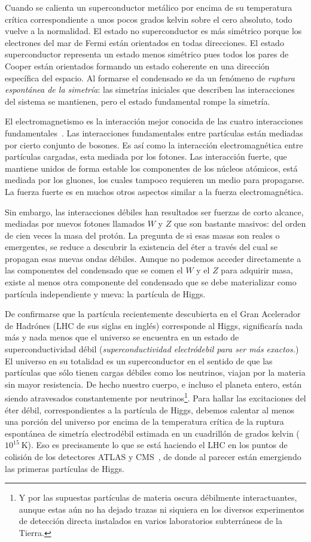 Cuando se calienta un superconductor metálico por encima de su temperatura crítica correspondiente a unos pocos grados kelvin sobre el cero absoluto, todo vuelve a la normalidad. El estado no superconductor es más simétrico porque los electrones del mar de Fermi están orientados en todas direcciones. El estado superconductor representa un estado menos simétrico pues todos los pares de Cooper están orientados formando un estado coherente en una dirección específica del espacio. Al formarse el condensado se da un fenómeno de \emph{ruptura espontánea de la simetría}: las simetrías iniciales que describen las interacciones del sistema se mantienen, pero el estado fundamental rompe la simetría.  

El electromagnetismo es la interacción mejor conocida de las cuatro interacciones fundamentales~\cite{pi}. Las interacciones fundamentales  entre partículas están mediadas por cierto conjunto de bosones.  Es así como la interacción electromagnética entre partículas cargadas, esta mediada por los fotones. Las interacción fuerte, que mantiene unidos de forma estable los componentes de los núcleos atómicos, está mediada por los gluones, los cuales tampoco requieren un medio para propagarse. La fuerza fuerte es en muchos otros aspectos similar a la fuerza electromagnética. 

Sin embargo, las interacciones débiles han resultados ser fuerzas de corto alcance, mediadas por nuevos fotones llamados $W$ y $Z$ que son bastante masivos: del orden de cien veces la masa del protón. La pregunta de si esas masas son reales o emergentes, se reduce a descubrir la existencia del éter a través del cual se propagan esas nuevas ondas débiles. Aunque no podemos acceder directamente a las componentes del condensado que se comen el $W$ y el $Z$ para adquirir masa, existe al menos otra componente del condensado que se debe materializar como partícula independiente y nueva: la partícula de Higgs. 

De confirmarse que la partícula recientemente descubierta en el Gran Acelerador de Hadrónes (LHC de sus siglas en inglés) corresponde al Higgs, significaría nada más y nada menos que el universo se encuentra en un estado de superconductividad débil (\emph{superconductividad electródebil para ser más exactos.}) El universo en su totalidad es un superconductor en el sentido de que las partículas que sólo tienen cargas débiles como los neutrinos, viajan por la materia sin mayor resistencia. De hecho nuestro cuerpo, e incluso el planeta entero, están siendo atravesados constantemente por neutrinos\footnote{Y por las supuestas partículas de materia oscura débilmente interactuantes, aunque estas aún no ha dejado trazas ni siquiera en los diversos experimentos de detección directa instalados en varios laboratorios subterráneos de la Tierra.}. Para hallar las excitaciones del éter débil, correspondientes a la partícula de Higgs, debemos calentar al menos una porción del universo por encima de la temperatura crítica de la ruptura espontánea de simetría electrodébil estimada en un cuadrillón de grados kelvin ($10^{15}\ $K). Eso es precisamente lo que se está haciendo el LHC en los puntos de colisión de los detectores ATLAS y CMS~\cite{quarknet}, de donde al parecer están emergiendo las primeras partículas de Higgs. 

